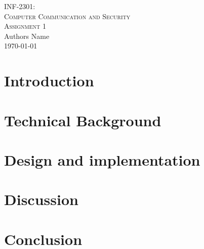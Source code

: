 



\def \courseCode {INF-2301}
\def \course {Computer Communication and Security}
\def \thetitle {Assignment 1}
\def \theauthor {Authors Name}




\begin{center}
\textsc{\Large \courseCode:\\ \course}\\[0.5cm]
\textsc{\LARGE \thetitle}\\[1.0cm]
\LARGE{\theauthor} \\[0.1cm]
{\large \today}
\end{center}

\section{Introduction}

\section{Technical Background}

\section{Design and implementation}

\section{Discussion}

\section{Conclusion}


